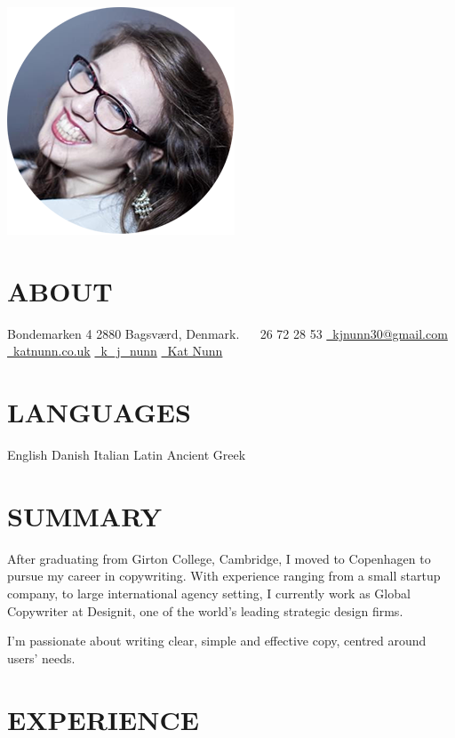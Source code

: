 \documentclass[]{friggeri-cv}
\begin{document}
{}

\begin{aside}
	\includegraphics[width=.66\textwidth]{../img/profile.png}
	\section{ABOUT}
	Bondemarken 4
	2880 Bagsværd,
	Denmark.
	~
	\faPhone~26 72 28 53
	\href{mailto:kjnunn30@gmail.com}{\faEnvelope~kjnunn30@gmail.com}
	\href{https://katnunn.co.uk}{\faGlobe~katnunn.co.uk}
	\href{https://twitter.com/k\_j\_nunn}{\faTwitter~k\_j\_nunn}
	\href{http://uk.linkedin.com/in/katnunn/}{\faLinkedin~Kat Nunn}
	\section{LANGUAGES}
	English
	Danish
	Italian
	Latin
	Ancient Greek
\end{aside}

\section{SUMMARY}
After graduating from Girton College, Cambridge, I moved to Copenhagen to pursue my career in copywriting. With experience ranging from a small startup company, to large international agency setting, I currently work as Global Copywriter at Designit, one of the world’s leading strategic design firms.

I’m passionate about writing clear, simple and effective copy, centred around users’ needs.

\section{EXPERIENCE}
\end{document}
